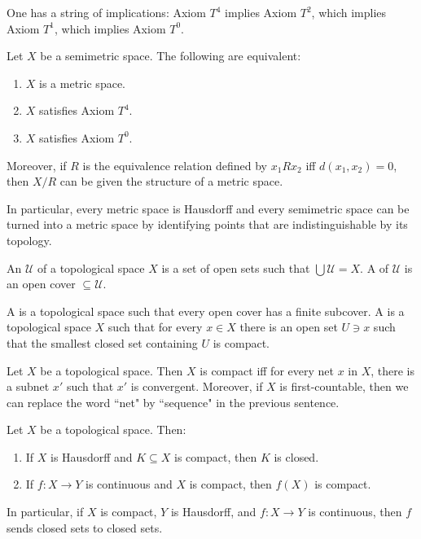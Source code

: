 \begin{lemma}
One has a string of implications: Axiom $T^4$ implies Axiom $T^2$, which implies Axiom $T^1$, which implies Axiom $T^0$.
\end{lemma}

\begin{lemma}
Let $X$ be a semimetric space. The following are equivalent:
\begin{enumerate}
\item $X$ is a metric space.
\item $X$ satisfies Axiom $T^4$.
\item $X$ satisfies Axiom $T^0$.
\end{enumerate}
Moreover, if $R$ is the equivalence relation defined by $x_1 R x_2$ iff $d(x_1, x_2) = 0$, then $X/R$ can be given the structure of a metric space.
\end{lemma}

\begin{subsec}
In particular, every metric space is Hausdorff and every semimetric space can be turned into a metric space by identifying points that are indistinguishable by its topology.
\end{subsec}

\begin{definition}
An  $\mathcal U$ of a topological space $X$ is a set of open sets such that $\bigcup \mathcal U = X$.
A  of $\mathcal U$ is an open cover $\subseteq \mathcal U$.
\end{definition}

\begin{definition}
A  is a topological space such that every open cover has a finite subcover.
A  is a topological space $X$ such that for every $x \in X$ there is an open set $U \ni x$ such that the smallest closed set containing $U$ is compact.
\end{definition}

\begin{lemma}
Let $X$ be a topological space. Then $X$ is compact iff for every net $x$ in $X$, there is a subnet $x'$ such that $x'$ is convergent.
Moreover, if $X$ is first-countable, then we can replace the word ``net" by ``sequence" in the previous sentence.
\end{lemma}

\begin{lemma}
Let $X$ be a topological space. Then:
\begin{enumerate}
\item If $X$ is Hausdorff and $K \subseteq X$ is compact, then $K$ is closed.
\item If $f: X \to Y$ is continuous and $X$ is compact, then $f(X)$ is compact.
\end{enumerate}
In particular, if $X$ is compact, $Y$ is Hausdorff, and $f: X \to Y$ is continuous, then $f$ sends closed sets to closed sets.
\end{lemma}

